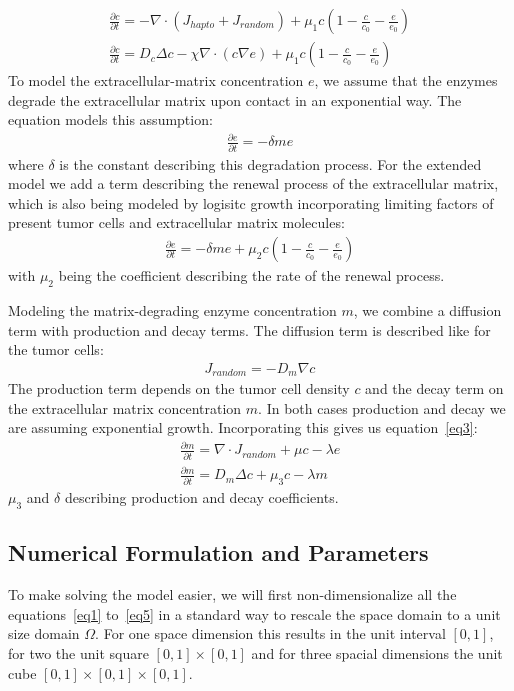 \begin{align*}
    \frac{\partial c}{\partial t} = -\nabla \cdot (J_{hapto} + J_{random}) + \mu_1 c (1-\frac{c}{c_0} - \frac{e}{e_0}) \\
    \frac{\partial c}{\partial t} = D_c \Delta c - \chi \nabla \cdot (c\nabla e) + \mu_1 c (1-\frac{c}{c_0} - \frac{e}{e_0})
\end{align*}
To model the extracellular-matrix concentration $e$, we assume that the enzymes degrade the extracellular matrix upon contact in an exponential way. The equation models this assumption:
\begin{align*}
    \frac{\partial e}{\partial t} = -\delta m e
\end{align*}
where $\delta$ is the constant describing this degradation process. For the extended model we add a term describing the renewal process of the extracellular matrix, which is also being modeled by logisitc growth incorporating limiting factors of present tumor cells and extracellular matrix molecules:
\begin{align*}
    \frac{\partial e}{\partial t} = -\delta m e + \mu_2 c (1 - \frac{c}{c_0} - \frac{e}{e_0})
\end{align*}
with $\mu_2$ being the coefficient describing the rate of the renewal process.

Modeling the matrix-degrading enzyme concentration $m$, we combine a diffusion term with production and decay terms. The diffusion term is described like for the tumor cells:
\begin{align*}
    J_{random} = -D_m \nabla c
\end{align*}
The production term depends on the tumor cell density $c$ and the decay term on the extracellular matrix concentration $m$. In both cases production and decay we are assuming exponential growth. Incorporating this gives us equation~\ref{eq3}:
\begin{align*}
    \frac{\partial m}{\partial t} = \nabla \cdot J_{random} + \mu c - \lambda e \\
    \frac{\partial m}{\partial t} = D_m \Delta c + \mu_3 c - \lambda m
\end{align*}
$\mu_3$ and $\delta$ describing production and decay coefficients.


\subsection{Numerical Formulation and Parameters}

To make solving the model easier, we will first non-dimensionalize all the equations~\ref{eq1} to~\ref{eq5} in a standard way to rescale the space domain to a unit size domain $\Omega$. For one space dimension this results in the unit interval $[0,1]$, for two the unit square $[0,1] \times [0,1]$ and for three spacial dimensions the unit cube $[0,1] \times [0,1] \times [0,1]$.

